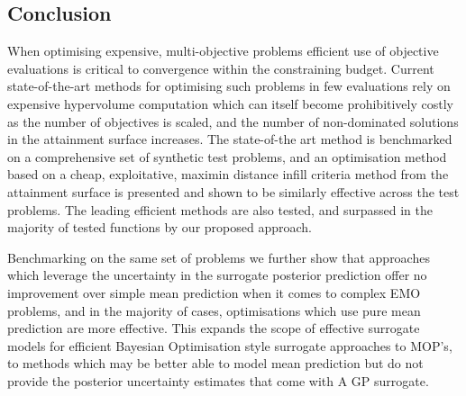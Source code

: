 \documentclass[conference]{IEEEtran}
\newcommand\gp{GP\xspace}
\newcommand\maximin{maximin\xspace}
\begin{document}
\subsection{Conclusion}
When optimising expensive, multi-objective problems efficient use of objective evaluations is critical to convergence within the constraining budget. Current state-of-the-art methods for optimising such problems in few evaluations rely on expensive hypervolume computation which can itself become prohibitively costly as the number of objectives is scaled, and the number of non-dominated solutions in the attainment surface increases. The state-of-the art method is benchmarked on a comprehensive set of synthetic test problems, and an optimisation method based on a cheap, exploitative, \maximin distance infill criteria method from the attainment surface is presented and shown to be similarly effective across the test problems. The leading efficient methods are also tested, and surpassed in the majority of tested functions by our proposed approach. 

Benchmarking on the same set of problems we further show that approaches which leverage the uncertainty in the surrogate posterior prediction offer no improvement over simple mean prediction when it comes to complex EMO problems, and in the majority of cases, optimisations which use pure mean prediction are more effective. This expands the scope of effective surrogate models for efficient Bayesian Optimisation style surrogate approaches to MOP's, to methods which may be better able to model mean prediction but do not provide the posterior uncertainty estimates that come with A \gp surrogate.





\end{document}
